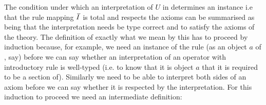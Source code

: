 The condition under which an interpretation of $U$ in \catcw determines an instance i.e that the rule mapping $\Ibar$ is total and respects the axioms can be summarised as being that the interpretation needs be type correct and to satisfy the axioms of the theory. The definition of exactly what we mean by this has to proceed by induction because, for example, we need an instance of the rule
 (as an object $a$ of \catc, say) before we can say whether an interpretation of an operator with introductory rule \genericfintroductoryrule
is well-typed (i.e. to know that it is object $a$ that it is required to be a section of).
Similarly we need to be able to interpret both sides of an axiom before we can say whether it is respected
by the interpretation. For this induction to proceed we need an intermediate definition:

\def\restrict{\mathbin{\restriction}}
\newcommand{\predInstance}{\overline{I \restrict U_p}}
\newcommand{\Uincrement}{U \setminus\kern-2pt U_p}

